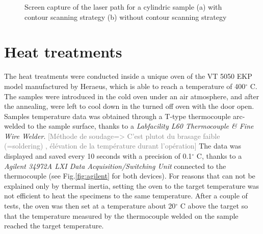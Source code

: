 \begin{figure}[ht]
\centering
\noindent{}
\decoRule
\caption[Screen capture of the laser path for a cylindric sample (a) with contour scanning strategy (b) without contour scanning strategy]{Screen capture of the laser path for a cylindric sample (a) with contour scanning strategy (b) without contour scanning strategy}
\label{fig:LasCSC}
\end{figure}

\section{Heat treatments}
\label{MMHT}
The heat treatments were conducted inside a unique oven of the VT 5050 EKP model manufactured by Heraeus, which is able to reach a temperature of 400$^\circ$ C. The samples were introduced in the cold oven under an air atmosphere, and after the annealing, were left to cool down in the turned off oven with the door open. Samples temperature data was obtained through a T-type thermocouple arc-welded to the sample surface, thanks to a \textit{Labfacility L60 Thermocouple \& Fine Wire Welder}. \textcolor{gray}{[Méthode de soudage=> C'est plutot du brasage faible (=soldering) , élévation de la température durant l'opération]} The data was displayed and saved every 10 seconds with a precision of 0.1$^\circ$ C, thanks to a \textit{Agilent 34972A LXI Data Acquisition/Switching Unit} connected to the thermocouple (see Fig.\ref{fig:agilent} for both devices). For reasons that can not be explained only by thermal inertia, setting the oven to the target temperature was not efficient to heat the specimens to the same temperature. After a couple of tests, the oven was then set at a temperature about 20$^\circ$ C above the target so that the temperature measured by the thermocouple welded on the sample reached the target temperature.\\

